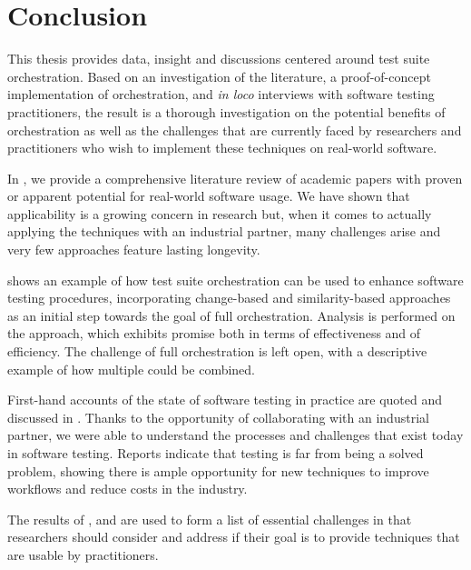 \chapter{Conclusion}\label{chap:conclusion}

This thesis provides data, insight and discussions centered around test suite orchestration.
Based on an investigation of the literature, a proof-of-concept implementation of orchestration, and \textit{in loco} interviews with software testing practitioners,
the result is a thorough investigation on the potential benefits of orchestration as well as the challenges that are currently faced by researchers and practitioners who wish to implement these techniques on real-world software.

In , we provide a comprehensive literature review of academic papers with proven or apparent potential for real-world software usage.
We have shown that applicability is a growing concern in research but, when it comes to actually applying the techniques with an industrial partner, many challenges arise and very few approaches feature lasting longevity.

 shows an example of how test suite orchestration can be used to enhance software testing procedures, incorporating change-based \tcs and similarity-based \tcp  approaches as an initial step towards the goal of full orchestration.
Analysis is performed on the approach, which exhibits promise both in terms of effectiveness and of efficiency.
The challenge of full orchestration is left open, with a descriptive example of how multiple \rt could be combined.

First-hand accounts of the state of software testing in practice are quoted and discussed in .
Thanks to the opportunity of collaborating with an industrial partner, we were able to understand the processes and challenges that exist today in software testing.
Reports indicate that testing is far from being a solved problem, showing there is ample opportunity for new techniques to improve workflows and reduce costs in the industry.

The results of ,  and  are used to form a list of essential challenges in  that researchers should consider and address if their goal is to provide techniques that are usable by practitioners.

